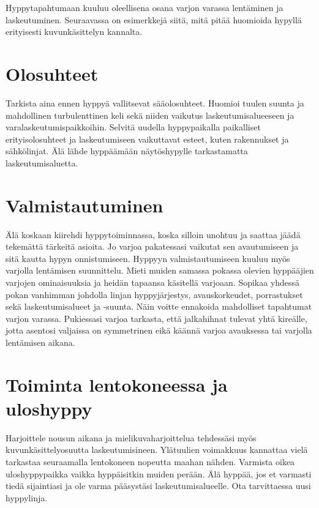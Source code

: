 
Hyppytapahtumaan kuuluu oleellisena osana varjon varassa lentäminen ja laskeutuminen. Seuraavassa on esimerkkejä siitä, mitä pitää huomioida hypyllä erityisesti kuvunkäsittelyn kannalta. 

\section{ Olosuhteet }
\label{hyppytapahtuma-kuvunkasittelyhypyilla-olosuhteet}


Tarkista aina ennen hyppyä vallitsevat sääolosuhteet. Huomioi tuulen suunta ja mahdollinen turbulenttinen keli sekä niiden vaikutus laskeutumisalueeseen ja varalaskeutumispaikkoihin. Selvitä uudella hyppypaikalla paikalliset erityisolosuhteet ja laskeutumiseen vaikuttavat esteet, kuten rakennukset ja sähkölinjat. Älä lähde hyppäämään näytöshypylle tarkastamatta laskeutumisaluetta.  

\section{ Valmistautuminen }
\label{hyppytapahtuma-kuvunkasittelyhypyilla-valmistautuminen}


Älä koskaan kiirehdi hyppytoiminnassa, koska silloin unohtuu ja saattaa jäädä tekemättä tärkeitä asioita. Jo varjoa pakatessasi vaikutat sen avautumiseen ja sitä kautta hypyn onnistumiseen. Hyppyyn valmistautumiseen kuuluu myös varjolla lentämisen suunnittelu. Mieti muiden samassa pokassa olevien hyppääjien varjojen ominaisuuksia ja heidän tapaansa käsitellä varjoaan. Sopikaa yhdessä pokan vanhimman johdolla linjan hyppyjärjestys, avauskorkeudet, porrastukset sekä laskeutumisalueet ja -suunta. Näin voitte ennakoida mahdolliset tapahtumat varjon varassa. Pukiessasi varjoa tarkasta, että jalkahihnat tulevat yhtä kireälle, jotta asentosi valjaissa on symmetrinen eikä käännä varjoa avauksessa tai varjolla lentämisen aikana. 

\section{ Toiminta lentokoneessa ja uloshyppy }
\label{hyppytapahtuma-kuvunkasittelyhypyilla-toiminta-lentokoneessa-ja-uloshyppy}


Harjoittele nousun aikana ja mielikuvaharjoittelua tehdessäsi myös kuvunkäsittelyosuutta laskeutumisineen. Ylätuulien voimakkuus kannattaa vielä tarkastaa seuraamalla lentokoneen nopeutta maahan nähden. Varmista oikea uloshyppypaikka vaikka hyppäisitkin muiden perään. Älä hyppää, jos et varmasti tiedä sijaintiasi ja ole varma pääsystäsi laskeutumisalueelle. Ota tarvittaessa uusi hyppylinja. 

